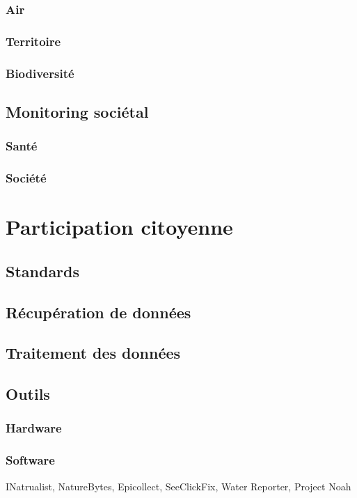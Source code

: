 \documentclass[a4paper,11pt,titlepage]{article}
\begin{document}
			\subsubsection{Air}
			\subsubsection{Territoire}
			\subsubsection{Biodiversité}
		
		\subsection{Monitoring sociétal}
			\subsubsection{Santé}
			\subsubsection{Société}
			
	\section{Participation citoyenne}
		\subsection{Standards}
		\subsection{Récupération de données}
		\subsection{Traitement des données}
		\subsection{Outils}
			\subsubsection{Hardware}
			\subsubsection{Software}
				INatrualist, NatureBytes, Epicollect, SeeClickFix, Water Reporter, Project Noah	
			
\end{document}
